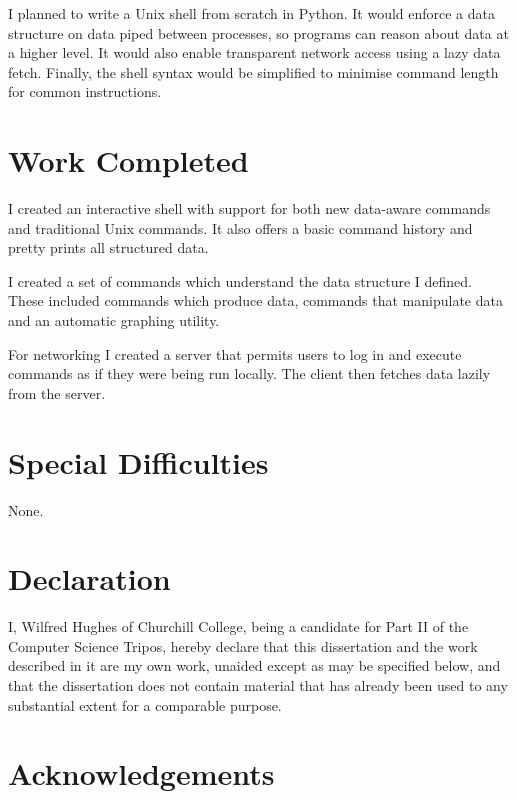\documentclass[12pt,twoside,notitlepage]{report}
\begin{document}
I planned to write a Unix shell from scratch in Python. It
would enforce a data structure on data piped between processes, so
programs can reason about data at a higher level. It would also enable
transparent network access using a lazy data fetch. Finally, the shell
syntax would be simplified to minimise command length for common
instructions.

\section*{Work Completed}
I created an interactive shell with support for both new data-aware commands and
traditional Unix commands. It also offers a basic command history and pretty
prints all structured data.

I created a set of commands which understand the data structure I defined. These
included commands which produce data, commands that manipulate data and an
automatic graphing utility.

For networking I created a server that permits users to log in and execute
commands as if they were being run locally. The client then fetches data lazily
from the server.

\section*{Special Difficulties}
None.
 
\newpage
\section*{Declaration}

I, Wilfred Hughes of Churchill College, being a candidate for Part II
of the Computer Science Tripos, hereby declare that this dissertation
and the work described in it are my own work, unaided except as may be
specified below, and that the dissertation does not contain material
that has already been used to any substantial extent for a comparable
purpose.

\bigskip
{}

\medskip
{}

\cleardoublepage

\tableofcontents

\listoffigures

\newpage
\section*{Acknowledgements}
\end{document}
